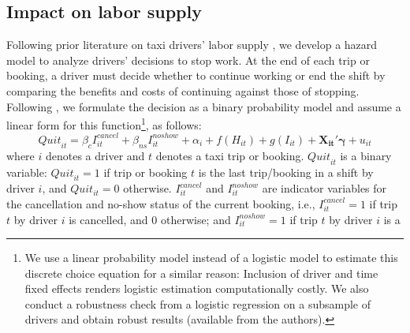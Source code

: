 \documentclass[reviewmode]{restat}
\begin{document}
\subsection{Impact on labor supply}
Following prior literature on taxi drivers' labor supply \citep{farber2005tomorrow,farber2015you,agarwal2015singaporean,chen2015dynamic}, we develop a hazard model 
to analyze drivers' decisions to stop work. At the end of each trip or booking, a driver must decide whether
to continue working or end the shift by comparing the benefits and costs of continuing against those of stopping. 
Following \citet{farber2005tomorrow,farber2015you}, we  
formulate the decision as a  binary probability model 
and assume a linear form for this function\footnote{We %
 use a linear probability model instead of a logistic model to estimate this discrete choice equation
 for a similar reason: Inclusion of driver and time fixed effects renders logistic estimation computationally
 costly. We also conduct a robustness check from a logistic regression on a subsample of drivers 
 and obtain robust results (available from the authors).}, as follows:
\begin{equation}
\label{eq:quit}
{Quit}_{it} = \beta_{c}I^{cancel}_{it} + \beta_{ns} I^{noshow}_{it} + \alpha_i + f(H_{it}) + g(I_{it}) + \mathbf{X_{it}}'\mathbf{\gamma}  + u_{it}
\end{equation}
where $i$ denotes a driver and $t$ denotes a taxi trip or booking. ${Quit}_{it}$ is a binary
variable: ${Quit}_{it} = 1$ if trip or booking $t$ is the last trip/booking in a shift by driver $i$,
and $Quit_{it} = 0$ otherwise. $I^{cancel}_{it}$ and $I^{noshow}_{it}$ are indicator variables for
the cancellation and no-show status of the current booking, i.e., $I^{cancel}_{it}=1$ if trip $t$ 
by driver $i$ is cancelled, and $0$ otherwise; and $I^{noshow}_{it}=1$ if trip $t$ by driver $i$ is a 
\end{document}
